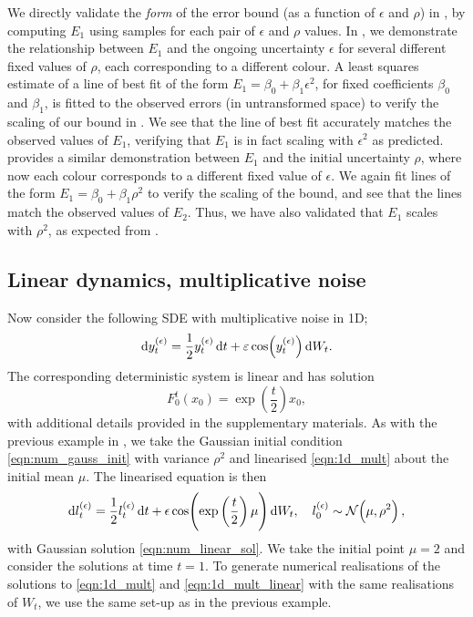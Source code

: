 We directly validate the \emph{form} of the error bound (as a function of \(\epsilon\) and \(\rho\)) in , by computing \(E_1\) using samples for each pair of \(\epsilon\) and \(\rho\) values.
In , we demonstrate the relationship between \(E_1\) and the ongoing uncertainty \(\epsilon\) for several different fixed values of \(\rho\), each corresponding to a different colour.
A least squares estimate of a line of best fit of the form \(E_1 = \beta_0 + \beta_1 \epsilon^2 \), for fixed coefficients \(\beta_0\) and \(\beta_1\), is fitted to the observed errors (in untransformed space) to verify the scaling of our bound in .
We see that the line of best fit accurately matches the observed values of \(E_1\), verifying that \(E_1\) is in fact scaling with \(\epsilon^2\) as predicted.
 provides a similar demonstration between \(E_1\) and the initial uncertainty \(\rho\), where now each colour corresponds to a different fixed value of \(\epsilon\).
We again fit lines of the form \(E_1 = \beta_0 + \beta_1 \rho^2\) to verify the scaling of the bound, and see that the lines match the observed values of \(E_2\).
Thus, we have also validated that \(E_1\) scales with \(\rho^2\), as expected from .


\subsection{Linear dynamics, multiplicative noise}\label{sec:numerics_multiplicative}
Now consider the following SDE with multiplicative noise in 1D;
\begin{equation}
	\dif y_t^{(\epsilon)} = \frac12 y_t^{(\epsilon)}\dif t + \varepsilon \cos\!\left(y_t^{(\epsilon)}\right) \dif W_t.
	\label{eqn:1d_mult}
\end{equation}
The corresponding deterministic system is linear and has solution
\begin{equation}
	F_0^t\!\left(x_0\right) = \exp\!\left(\frac{t}{2}\right) x_0,
	\label{eqn:1d_mult_det_sol}
\end{equation}
with additional details provided in the supplementary materials.
As with the previous example in , we take the Gaussian initial condition \cref{eqn:num_gauss_init} with variance \(\rho^2\) and linearised \cref{eqn:1d_mult} about the initial mean \(\mu\).
The linearised equation is then
\begin{equation}
	\dif l_t^{(\epsilon)} = \frac12 l_t^{(\epsilon)}\dif t + \epsilon \cos\!\left(\exp\left(\frac{t}{2}\right)\mu\right) \dif W_t, \quad l_0^{(\epsilon)} \sim \Gauss{\mu, \rho^2},
	\label{eqn:1d_mult_linear}
\end{equation}
with Gaussian solution \cref{eqn:num_linear_sol}.
We take the initial point \(\mu = 2\) and consider the solutions at time \(t = 1\).
To generate numerical realisations of the solutions to \cref{eqn:1d_mult} and \cref{eqn:1d_mult_linear} with the same realisations of \(W_t\), we use the same set-up as in the previous example.

